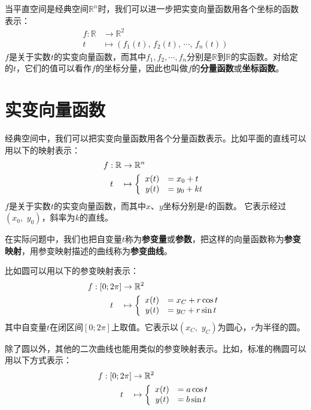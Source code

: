 \documentclass[12pt,UTF8]{ctexbook}
\begin{document}
当平直空间是经典空间$\mathbb{R}^n$时，我们可以进一步把实变向量函数用各个坐标的函数表示：
\begin{align*}
    f: \mathbb{R} &\rightarrow \mathbb{R}^2 \\
    t\quad &\mapsto (f_1(t),\, f_2(t),\, \cdots ,\, f_n(t))
\end{align*}
$f$是关于实数$t$的实变向量函数，而其中$f_1,f_2, \cdots, f_n$分别是$\mathbb{R}$到$\mathbb{R}$的实函数。对给定的$t$，它们的值可以看作$f$的坐标分量，因此也叫做$f$的\textbf{分量函数}或\textbf{坐标函数}。

\section{实变向量函数}

经典空间中，我们可以把实变向量函数用各个分量函数表示。比如平面的直线可以用以下的映射表示：
\begin{align*}
    f: \mathbb{R} &\rightarrow \mathbb{R}^n \\
    t\quad &\mapsto\left\{
        \begin{array}[]{rl}
            x(t) &= x_0 + t \\
            y(t) &= y_0 + kt \\
        \end{array}
    \right.
\end{align*}
$f$是关于实数$t$的实变向量函数，而其中$x$、$y$坐标分别是$t$的函数。
它表示经过$(x_0,\,\, y_0)$，斜率为$k$的直线。

在实际问题中，我们也把自变量$t$称为\textbf{参变量}或\textbf{参数}，把这样的向量函数称为\textbf{参变映射}，用参变映射描述的曲线称为\textbf{参变曲线}。

比如圆可以用以下的参变映射表示：
\begin{align*}
    f: [0;2\pi] &\rightarrow \mathbb{R}^2 \\
    t\quad &\mapsto\left\{
        \begin{array}[]{rl}
            x(t) &= x_C + r\cos{t} \\
            y(t) &= y_C + r\sin{t} \\
        \end{array}
    \right.
\end{align*}
其中自变量$t$在闭区间$[0;2\pi]$上取值。它表示以$(x_C,\,\, y_C)$为圆心，$r$为半径的圆。

除了圆以外，其他的二次曲线也能用类似的参变映射表示。比如，标准的椭圆可以用以下方式表示：
\begin{align*}
    f: [0;2\pi] &\rightarrow \mathbb{R}^2 \\
    t\quad &\mapsto\left\{
        \begin{array}[]{rl}
            x(t) &= a\cos{t} \\
            y(t) &= b\sin{t} \\
        \end{array}
    \right.
\end{align*}
\end{document}
